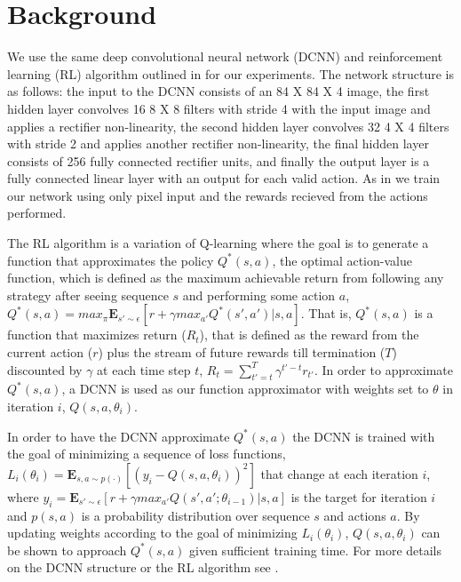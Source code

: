 \documentclass{llncs}
\begin{document}
%

%
\section{Background}

We use the same deep convolutional neural network (DCNN) and reinforcement learning (RL) algorithm outlined in \citep{mnih2015human} for our experiments. The network structure is as follows: the input to the DCNN consists of an 84 X 84 X 4 image, the first hidden layer convolves 16 8 X 8 filters with stride 4 with the input image and applies a rectifier non-linearity, the second hidden layer convolves 32 4 X 4 filters with stride 2 and applies another rectifier non-linearity, the final hidden layer consists of 256 fully connected rectifier units, and finally the output layer is a fully connected linear layer with an output for each valid action. As in \citep{mnih2015human} we train our network using only pixel input and the rewards recieved from the actions performed. 

The RL algorithm is a variation of Q-learning where the goal is to generate a function that approximates the policy $Q^{*}(s,a)$, the optimal action-value function, which is defined as the maximum achievable return from following any strategy after seeing sequence $s$ and performing some action $a$, $Q^{*}(s,a)=max_{\pi}{\mathbf{E}}_{s' \sim \epsilon} [r + \gamma max_{a'} Q^{*}(s',a') | s,a]$.
That is, $Q^{*}(s,a)$ is a function that maximizes return ($R_{t}$), that is defined as the reward from the current action ($r$) plus the stream of future rewards till termination ($T$) discounted by $\gamma$ at each time step $t$, $R_{t}=\sum_{t' = t}^{T}\gamma^{t'-t}r_{t'}$.
In order to approximate $Q^{*}(s,a)$, a DCNN is used as our function approximator with weights set to $\theta$ in iteration $i$, $Q(s,a,\theta_{i})$.

In order to have the DCNN approximate $Q^{*}(s,a)$ the DCNN is trained with the goal of minimizing a sequence of loss functions, $L_{i}(\theta_{i}) = {\mathbf{E}}_{s,a \sim p(\cdot)}[(y_{i}-Q(s,a,\theta_{i}))^{2}]$ that change at each iteration $i$, where $y_{i}={\mathbf{E}}_{s' \sim \epsilon} [r + \gamma max_{a'} Q(s',a';\theta_{i-1}) | s,a]$ is the target for iteration $i$ and $p(s,a)$ is a probability distribution over sequence $s$ and actions $a$. 
By updating weights according to the goal of minimizing $L_{i}(\theta_{i})$, $Q(s,a,\theta_{i})$ can be shown to approach $Q^{*}(s,a)$ given sufficient training time. 
For more details on the DCNN structure or the RL algorithm see \citep{mnih2015human}.
\end{document}
